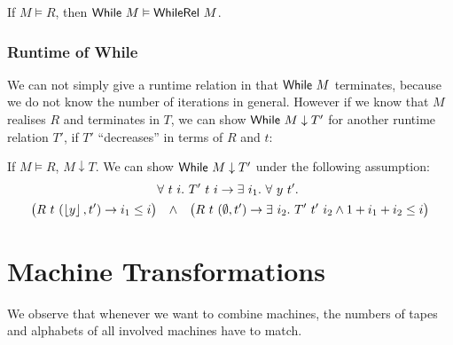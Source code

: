 \begin{lemma}
  If $M \vDash R$, then $\textsf{While}~ M \vDash \textsf{WhileRel}~M$.
\end{lemma}




\subsubsection{Runtime of While}
\label{sec:While-runtime}

We can not simply give a runtime relation in that $\textsf{While}~ M$ terminates, because we do not know the number of iterations in general.  However if we
know that $M$ realises $R$ and terminates in $T$, we can show $\textsf{While}~ M \downarrow T'$ for another runtime relation $T'$, if $T'$ ``decreases'' in
terms of $R$ and $t$:

\begin{lemma}
  If $M \vDash R$, $M \downarrow T$.  We can show $\textsf{While}~ M \downarrow T'$ under the following assumption:
  \begin{multline*}
    \forall~t~i.~
    T'~t~i \rightarrow
    \exists~i_1.~
    \forall~y~t'.~ \\
    \bigl(
    R~t~(\left\lfloor {y} \right\rfloor, t') \rightarrow i_1 \le i
    \bigl) \quad\land\quad
    \bigl(
    R~t~(\emptyset, t') \rightarrow
    \exists~i_2.~
    T'~t'~i_2 \land
    1 + i_1 + i_2 \le i
    \bigr)
  \end{multline*}
\end{lemma}







\section{Machine Transformations}
\label{sec:transformations}

We observe that whenever we want to combine machines, the numbers of tapes and alphabets of all involved machines have to match.

